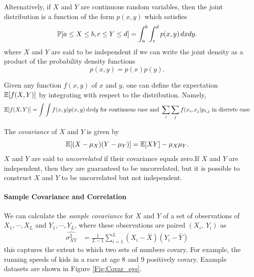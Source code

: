 Alternatively, if $X$ and $Y$ are continuous random variables, then the joint distribution is a function of the form $p(x,y)$ which satisfies 
\begin{equation}
\P[a\le X\le b, c\le Y\le d]= \int_a^b \int_c^d p(x,y)\,dxdy. 
\end{equation}
where $X$ and $Y$ are said to be independent if we can write the
joint density as a product of the probability density functions 
\begin{equation}
p(x,y) = p(x) p(y).
\end{equation}

Given any function $f(x,y)$ of $x$ and $y$, one can define the expectation $\E[f(X,Y)]$ by integrating with respect to the distribution. Namely, 
\begin{equation}
\E[f(X,Y)]=\int \int f(x,y)p(x,y)\,dxdy \mbox{ for continuous case and } \sum_i \sum_j f(x_i,x_j) p_{i,j} \mbox{ in discrete case}
\end{equation}

The \emph{covariance} of  $X$ and $Y$ is given by 
\begin{equation}
\E[(X-\mu_X)(Y-\mu_Y)]=\E[XY]-\mu_X\mu_Y. 
\end{equation}
$X$ and $Y$ are said to \emph{uncorrelated} if their covariance equals
zero.If $X$ and $Y$ are independent, then they are guaranteed to be
uncorrelated, but it is possible to construct $X$ and $Y$ to be
uncorrelated but not independent. 


\paragraph{Sample Covariance and Correlation} 
We can calculate the \emph{sample covariance} for $X$ and $Y$ of a set of observations
of $X_1, \cdots, X_L$ and $Y_1, \cdots, Y_L$, where these observations
are paired $(X_i,~Y_i)$ as
\begin{align}
 \widehat{\sigma_{XY}^2}  &= \frac{1}{L-1} \sum_{i=1}^L (X_i -
                            \bar{X}) (Y_i - \bar{Y})  %
\end{align}
this captures the extent to which two sets of numbers covary. For
example, the running speeds of kids in a race at age 8 and 9 positively
covary. Example datasets are shown in Figure \ref{Fig:Covar_egs}. 

